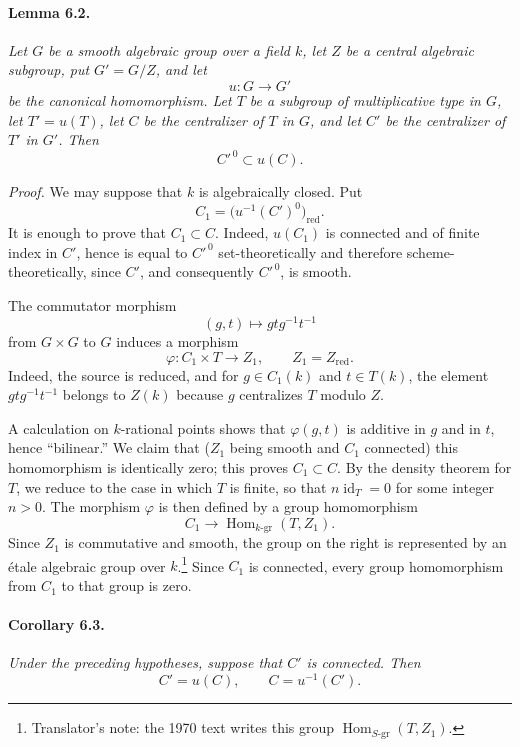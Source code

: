 \paragraph{\textbf{Lemma 6.2.}}
\emph{Let \(G\) be a smooth algebraic group over a field \(k\), let
\(Z\) be a central algebraic subgroup, put \(G'=G/Z\), and let
\[
  u:G\longrightarrow G'
\]
be the canonical homomorphism. Let \(T\) be a subgroup of
multiplicative type in \(G\), let \(T'=u(T)\), let \(C\) be the
centralizer of \(T\) in \(G\), and let \(C'\) be the centralizer of
\(T'\) in \(G'\). Then
\[
  C'^{\,0}\subset u(C).
\]}

\emph{Proof.}
We may suppose that \(k\) is algebraically closed. Put
\[
  C_1=\bigl(u^{-1}(C')^{0}\bigr)_{\mathrm{red}}.
\]
It is enough to prove that \(C_1\subset C\). Indeed, \(u(C_1)\) is
connected and of finite index in \(C'\), hence is equal to \(C'^{\,0}\)
set-theoretically and therefore scheme-theoretically, since \(C'\),
and consequently \(C'^{\,0}\), is smooth.

The commutator morphism
\[
  (g,t)\longmapsto gtg^{-1}t^{-1}
\]
from \(G\times G\) to \(G\) induces a morphism
\[
  \varphi:C_1\times T\longrightarrow Z_1,
  \qquad Z_1=Z_{\mathrm{red}}.
\]
Indeed, the source is reduced, and for \(g\in C_1(k)\) and
\(t\in T(k)\), the element \(gtg^{-1}t^{-1}\) belongs to \(Z(k)\)
because \(g\) centralizes \(T\) modulo \(Z\).

A calculation on \(k\)-rational points shows that
\(\varphi(g,t)\) is additive in \(g\) and in \(t\), hence
``bilinear.'' We claim that (\(Z_1\) being smooth and \(C_1\)
connected) this homomorphism is identically zero;
this proves \(C_1\subset C\). By the density theorem for \(T\), we
reduce to the case in which \(T\) is finite, so that
\(n\operatorname{id}_T=0\) for some integer \(n>0\). The morphism
\(\varphi\) is then defined by a group homomorphism
\[
  C_1\longrightarrow \operatorname{Hom}_{k\text{-gr}}(T,Z_1).
\]
Since \(Z_1\) is commutative and smooth, the group on the right is
represented by an étale algebraic group over \(k\).\footnote{Translator's
note: the 1970 text writes this group
\(\operatorname{Hom}_{S\text{-gr}}(T,Z_1)\).} Since \(C_1\)
is connected, every group homomorphism from \(C_1\) to that group
is zero.

\paragraph{\textbf{Corollary 6.3.}}
\emph{Under the preceding hypotheses, suppose that \(C'\) is
connected. Then
\[
  C'=u(C),
  \qquad
  C=u^{-1}(C').
\]}

